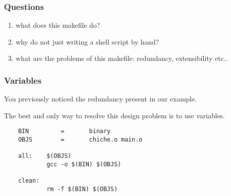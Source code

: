 
\begin{frame}
  \frametitle{Questions}

  \begin{enumerate}
    \item
      what does this makefile do?
    \item
      why do not just writing a shell script by hand?
    \item
      what are the problems of this makefile: redundancy, extensibility etc..
  \end{enumerate}
\end{frame}


\begin{frame}[containsverbatim]
  \frametitle{Variables}

  You previously noticed the redundancy present in our example.

  \nl

  The best and only way to resolve this design problem is to use variables.

  \nl

  \begin{verbatim}
    BIN         =       binary
    OBJS        =       chiche.o main.o

    all:    $(OBJS)
            gcc -o $(BIN) $(OBJS)

    clean:
            rm -f $(BIN) $(OBJS)
  \end{verbatim}
\end{frame}


